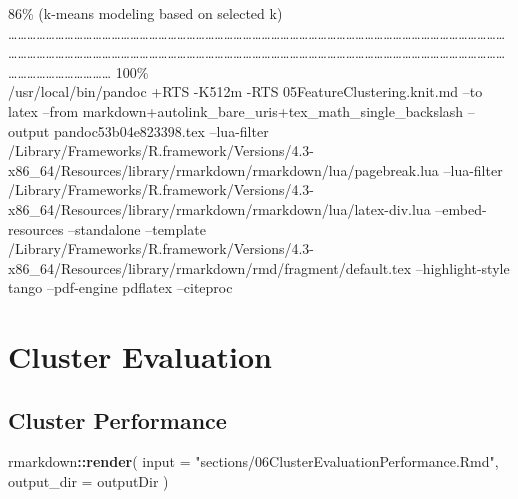 \documentclass[
]{article}
\newenvironment{Shaded}{\begin{snugshade}}{\end{snugshade}}
\newcommand{\AttributeTok}[1]{\textcolor[rgb]{0.13,0.29,0.53}{#1}}
\newcommand{\FunctionTok}[1]{\textcolor[rgb]{0.13,0.29,0.53}{\textbf{#1}}}
\newcommand{\NormalTok}[1]{#1}
\newcommand{\SpecialCharTok}[1]{\textcolor[rgb]{0.81,0.36,0.00}{\textbf{#1}}}
\newcommand{\StringTok}[1]{\textcolor[rgb]{0.31,0.60,0.02}{#1}}
\begin{document}
\textbar{} 86\% (k-means modeling based on selected k) \textbar{}
\textbar\ldots\ldots\ldots\ldots\ldots\ldots\ldots\ldots\ldots\ldots\ldots\ldots\ldots\ldots\ldots\ldots\ldots\ldots\ldots\ldots\ldots\ldots\ldots\ldots\ldots\ldots\ldots\ldots\ldots\ldots\ldots\ldots\ldots\ldots\ldots\ldots\ldots\ldots\ldots\ldots\ldots\ldots\ldots\ldots\ldots\ldots\ldots\ldots\ldots\ldots\ldots\ldots\ldots\ldots\ldots\ldots\ldots\ldots\ldots\ldots\ldots\ldots\ldots\ldots\ldots\ldots\ldots\ldots\ldots\ldots\ldots\ldots\ldots\ldots\ldots\ldots\ldots\ldots\ldots\ldots\ldots\ldots\ldots\ldots\ldots\ldots\ldots\ldots\ldots\ldots\ldots\ldots\ldots\ldots\ldots\ldots\ldots\ldots\ldots\ldots\ldots\ldots\ldots\ldots\ldots\ldots\ldots\ldots\ldots\ldots\ldots\ldots\ldots\ldots\ldots\ldots\ldots\textbar{}
100\%\\
/usr/local/bin/pandoc +RTS -K512m -RTS 05FeatureClustering.knit.md --to
latex --from markdown+autolink\_bare\_uris+tex\_math\_single\_backslash
--output pandoc53b04e823398.tex --lua-filter
/Library/Frameworks/R.framework/Versions/4.3-x86\_64/Resources/library/rmarkdown/rmarkdown/lua/pagebreak.lua
--lua-filter
/Library/Frameworks/R.framework/Versions/4.3-x86\_64/Resources/library/rmarkdown/rmarkdown/lua/latex-div.lua
--embed-resources --standalone --template
/Library/Frameworks/R.framework/Versions/4.3-x86\_64/Resources/library/rmarkdown/rmd/fragment/default.tex
--highlight-style tango --pdf-engine pdflatex --citeproc

\hypertarget{cluster-evaluation}{%
\section{Cluster Evaluation}\label{cluster-evaluation}}

\hypertarget{cluster-performance}{%
\subsection{Cluster Performance}\label{cluster-performance}}

\begin{Shaded}
\begin{Highlighting}[]
\NormalTok{rmarkdown}\SpecialCharTok{::}\FunctionTok{render}\NormalTok{(}
  \AttributeTok{input =} \StringTok{"sections/06ClusterEvaluationPerformance.Rmd"}\NormalTok{,}
  \AttributeTok{output\_dir =}\NormalTok{ outputDir}
\NormalTok{)}
\end{Highlighting}
\end{Shaded}
\end{document}
